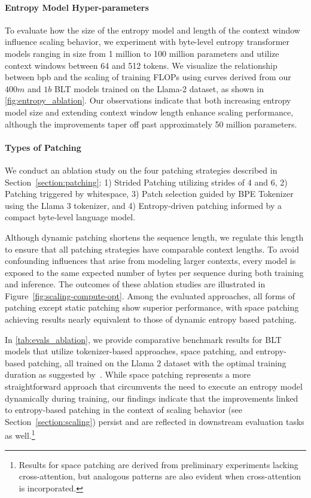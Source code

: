 \paragraph{Entropy Model Hyper-parameters} To evaluate how the size of the entropy model and length of the context window influence scaling behavior, we experiment with byte-level entropy transformer models ranging in size from 1 million to 100 million parameters and utilize context windows between 64 and 512 tokens. We visualize the relationship between bpb and the scaling of training FLOPs using curves derived from our $400m$ and $1b$ {\textsc BLT} models trained on the Llama-2 dataset, as shown in \autoref{fig:entropy_ablation}. Our observations indicate that both increasing entropy model size and extending context window length enhance scaling performance, although the improvements taper off past approximately 50 million parameters.

\paragraph{Types of Patching}

We conduct an ablation study on the four patching strategies described in Section~\ref{section:patching}: 1) Strided Patching utilizing strides of 4 and 6, 2) Patching triggered by whitespace, 3) Patch selection guided by BPE Tokenizer using the Llama 3 tokenizer, and 4) Entropy-driven patching informed by a compact byte-level language model.

Although dynamic patching shortens the sequence length, we regulate this length to ensure that all patching strategies have comparable context lengths. To avoid confounding influences that arise from modeling larger contexts, every model is exposed to the same expected number of bytes per sequence during both training and inference. The outcomes of these ablation studies are illustrated in Figure~\ref{fig:scaling-compute-opt}. Among the evaluated approaches, all forms of patching except static patching show superior performance, with space patching achieving results nearly equivalent to those of dynamic entropy based patching.

In \autoref{tab:evals_ablation}, we provide comparative benchmark results for {\textsc BLT} models that utilize tokenizer-based approaches, space patching, and entropy-based patching, all trained on the Llama 2 dataset with the optimal training duration as suggested by~\citet{dubey2024llama}. While space patching represents a more straightforward approach that circumvents the need to execute an entropy model dynamically during training, our findings indicate that the improvements linked to entropy-based patching in the context of scaling behavior (see Section~\ref{section:scaling}) persist and are reflected in downstream evaluation tasks as well.\footnote{Results for space patching are derived from preliminary experiments lacking cross-attention, but analogous patterns are also evident when cross-attention is incorporated.}

